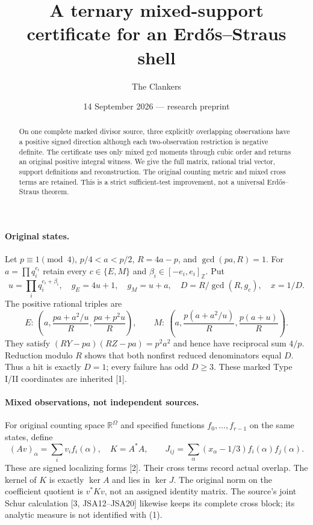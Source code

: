 \documentclass[10pt,a4paper]{article}
\title{A ternary mixed-support certificate for an Erd\H{o}s--Straus shell}
\author{The Clankers}
\date{14 September 2026 --- research preprint}
\begin{document}
\maketitle
\begin{abstract}
On one complete marked divisor source, three explicitly overlapping observations
have a positive signed direction although each two-observation restriction is
negative definite. The certificate uses only mixed gcd moments through cubic
order and returns an original positive integral witness. We give the full
matrix, rational trial vector, support definitions and reconstruction.
The original counting metric and mixed cross terms are retained. This is a
strict sufficient-test improvement, not a universal Erd\H{o}s--Straus theorem.
\end{abstract}

\paragraph{Original states.}
Let $p\equiv1\pmod4$, $p/4<a<p/2$, $R=4a-p$, and $\gcd(pa,R)=1$.
For $a=\prod q_i^{e_i}$ retain every $c\in\{E,M\}$ and
$\beta_i\in[-e_i,e_i]_{\mathbb Z}$. Put
\[
 u=\prod_iq_i^{e_i+\beta_i},\quad g_E=4u+1,\quad g_M=u+a,\quad
 D=R/\gcd(R,g_c),\quad x=1/D.
\]
The positive rational triples are
\[
 E:\ \left(a,\frac{pa+a^2/u}{R},\frac{pa+p^2u}{R}\right),\qquad
 M:\ \left(a,\frac{p(a+a^2/u)}R,\frac{p(a+u)}R\right).
\]
They satisfy $(RY-pa)(RZ-pa)=p^2a^2$ and hence have reciprocal sum $4/p$.
Reduction modulo $R$ shows that both nonfirst reduced denominators equal $D$.
Thus a hit is exactly $D=1$; every failure has odd $D\ge3$.
These marked Type I/II coordinates are inherited [1].

\paragraph{Mixed observations, not independent sources.}
For original counting space $\mathbb R^\Omega$ and specified functions
$f_0,\ldots,f_{r-1}$ on the same states, define
\[
 (Av)_\alpha=\sum_i v_if_i(\alpha),\quad K=A^*A,\qquad
 J_{ij}=\sum_\alpha(x_\alpha-1/3)f_i(\alpha)f_j(\alpha).
 \tag{1}
\]
These are signed localizing forms [2]. Their cross terms record actual overlap.
The kernel of $K$ is exactly $\ker A$ and lies in $\ker J$. The original
norm on the coefficient quotient is $v^*Kv$, not an assigned identity matrix.
The source's joint Schur calculation [3, JSA12--JSA20] likewise keeps its
complete cross block; its analytic measure is not identified with (1).
\end{document}
